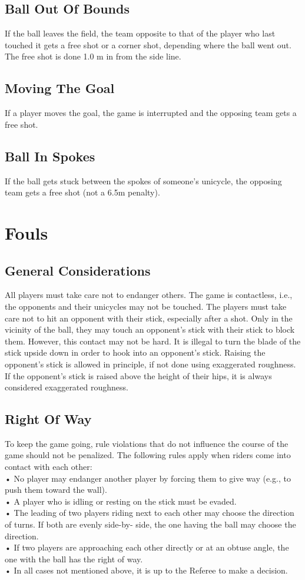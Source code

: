 \subsection{Ball Out Of Bounds}
If the ball leaves the field, the team opposite to that of the player who last touched it gets a free shot or a corner shot,
depending where the ball went out. The free shot is done 1.0 m in from the side line.
\subsection{Moving The Goal}
If a player moves the goal, the game is interrupted and the opposing team gets a free shot.
\subsection{Ball In Spokes}
If the ball gets stuck between the spokes of someone’s unicycle, the opposing team gets a free shot (not a 6.5m
penalty).
\section{Fouls}
\subsection{General Considerations}
All players must take care not to endanger others. The game is contactless, i.e., the opponents and their unicycles may
not be touched. The players must take care not to hit an opponent with their stick, especially after a shot. Only in the
vicinity of the ball, they may touch an opponent’s stick with their stick to block them. However, this contact may not
be hard. It is illegal to turn the blade of the stick upside down in order to hook into an opponent's stick. Raising the
opponent's stick is allowed in principle, if not done using exaggerated roughness. If the opponent's stick is raised above
the height of their hips, it is always considered exaggerated roughness.
\subsection{Right Of Way}
To keep the game going, rule violations that do not influence the course of the game should not be penalized. The
following rules apply when riders come into contact with each other:\\
• No player may endanger another player by forcing them to give way (e.g., to push them toward the wall).\\
• A player who is idling or resting on the stick must be evaded.\\
• The leading of two players riding next to each other may choose the direction of turns. If both are evenly side-by-
side, the one having the ball may choose the direction.\\
• If two players are approaching each other directly or at an obtuse angle, the one with the ball has the right of way.\\
• In all cases not mentioned above, it is up to the Referee to make a decision.\\
